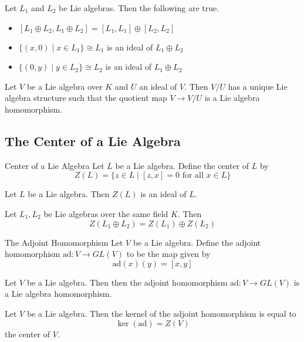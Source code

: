 \documentclass[a4paper]{article}
\begin{document}
\begin{prp}{}{} Let $L_1$ and $L_2$ be Lie algebras. Then the following are true. 
\begin{itemize}
\item $[L_1\oplus L_2,L_1\oplus L_2]=[L_1,L_1]\oplus[L_2,L_2]$
\item $\{(x,0)\;|\;x\in L_1\}\cong L_1$ is an ideal of $L_1\oplus L_2$
\item $\{(0,y)\;|\;y\in L_2\}\cong L_2$ is an ideal of $L_1\oplus L_2$
\end{itemize}
\end{prp}

\begin{prp}{}{} Let $V$ be a Lie algebra over $K$ and $U$ an ideal of $V$. Then $V/U$ has a unique Lie algebra structure such that the quotient map $V\to V/U$ is a Lie algebra homomorphism. 
\end{prp}

\subsection{The Center of a Lie Algebra}
\begin{defn}{Center of a Lie Algebra}{} Let $L$ be a Lie algebra. Define the center of $L$ by $$Z(L)=\{z\in L\;|\;[z,x]=0\text{ for all }x\in L\}$$
\end{defn}

\begin{lmm}{}{} Let $L$ be a Lie algebra. Then $Z(L)$ is an ideal of $L$. 
\end{lmm}

\begin{prp}{}{} Let $L_1,L_2$ be Lie algebras over the same field $K$. Then $$Z(L_1\oplus L_2)=Z(L_1)\oplus Z(L_2)$$
\end{prp}

\begin{defn}{The Adjoint Homomorphism}{} Let $V$ be a Lie algebra. Define the adjoint homomorphism $\text{ad}:V\to GL(V)$ to be the map given by $$\text{ad}(x)(y)=[x,y]$$
\end{defn}

\begin{lmm}{}{} Let $V$ be a Lie algebra. Then then the adjoint homomorphism $\text{ad}:V\to GL(V)$ is a Lie algebra homomorphism. 
\end{lmm}

\begin{lmm}{}{} Let $V$ be a Lie algebra. Then the kernel of the adjoint homomorphism is equal to $$\ker(\text{ad})=Z(V)$$ the center of $V$. 
\end{lmm}
\end{document}
